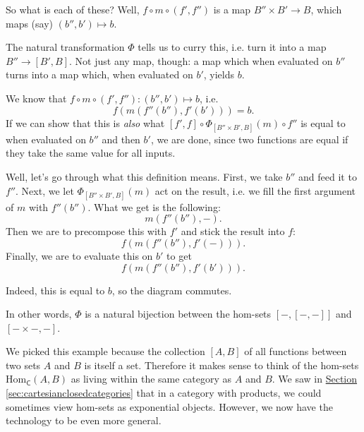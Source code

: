 \documentclass[a4paper,10pt]{scrreprt}
\newcommand{\Hom}{\mathrm{Hom}}
\theoremstyle{definition}
\theoremstyle{plain}
\theoremstyle{remark}
\begin{document}
So what is each of these? Well, $f \circ m \circ (f', f'')$ is a map $B'' \times B' \to B$, which maps (say) $(b'', b') \mapsto b$. 

The natural transformation $\Phi$ tells us to curry this, i.e. turn it into a map $B'' \to [B', B]$. Not just any map, though: a map which when evaluated on $b''$ turns into a map which, when evaluated on $b'$, yields $b$.

We know that $f \circ m \circ (f', f'')\colon (b'', b') \mapsto b$, i.e.
\begin{equation*}
  f(m(f''(b''), f'(b'))) = b.
\end{equation*}
If we can show that this is \emph{also} what $[f', f] \circ \Phi_{[B'' \times B', B]}(m) \circ f''$ is equal to when evaluated on $b''$ and then $b'$, we are done, since two functions are equal if they take the same value for all inputs.

Well, let's go through what this definition means. First, we take $b''$ and feed it to $f''$. Next, we let $\Phi_{[B'' \times B', B]}(m)$ act on the result, i.e. we fill the first argument of $m$ with $f''(b'')$. What we get is the following:
\begin{equation*}
  m(f''(b''), -).
\end{equation*}
Then we are to precompose this with $f'$ and stick the result into $f$:
\begin{equation*}
  f(m(f''(b''), f'(-))).
\end{equation*}
Finally, we are to evaluate this on $b'$ to get
\begin{equation*}
  f(m(f''(b''), f'(b'))).
\end{equation*}

Indeed, this is equal to $b$, so the diagram commutes.

In other words, $\Phi$ is a natural bijection between the hom-sets $[-,[-,-]]$ and $[- \times -, -]$.

We picked this example because the collection $[A, B]$ of all functions between two sets $A$ and $B$ is itself a set. Therefore it makes sense to think of the hom-sets $\Hom_{\mathsf{C}}(A, B)$ as living within the same category as $A$ and $B$. We saw in \hyperref[sec:cartesianclosedcategories]{Section \ref*{sec:cartesianclosedcategories}} that in a category with products, we could sometimes view hom-sets as exponential objects. However, we now have the technology to be even more general.
\end{document}
